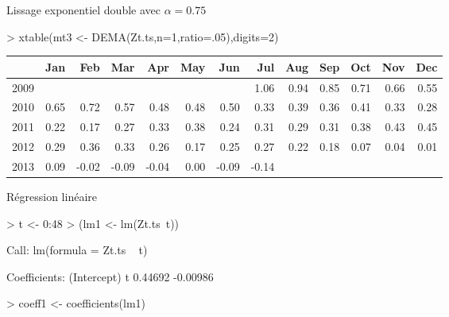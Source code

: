 \documentclass{article}
\begin{document}
\clearpage 
Lissage exponentiel double avec $\alpha=0.75$
\begin{Schunk}
\begin{Sinput}
> xtable(mt3 <- DEMA(Zt.ts,n=1,ratio=.05),digits=2)
\end{Sinput}
\begin{table}[ht]
\centering
\begin{tabular}{rrrrrrrrrrrrr}
  \hline
 & Jan & Feb & Mar & Apr & May & Jun & Jul & Aug & Sep & Oct & Nov & Dec \\ 
  \hline
2009 &  &  &  &  &  &  & 1.06 & 0.94 & 0.85 & 0.71 & 0.66 & 0.55 \\ 
  2010 & 0.65 & 0.72 & 0.57 & 0.48 & 0.48 & 0.50 & 0.33 & 0.39 & 0.36 & 0.41 & 0.33 & 0.28 \\ 
  2011 & 0.22 & 0.17 & 0.27 & 0.33 & 0.38 & 0.24 & 0.31 & 0.29 & 0.31 & 0.38 & 0.43 & 0.45 \\ 
  2012 & 0.29 & 0.36 & 0.33 & 0.26 & 0.17 & 0.25 & 0.27 & 0.22 & 0.18 & 0.07 & 0.04 & 0.01 \\ 
  2013 & 0.09 & -0.02 & -0.09 & -0.04 & 0.00 & -0.09 & -0.14 &  &  &  &  &  \\ 
   \hline
\end{tabular}
\end{table}\end{Schunk}
\clearpage 
Régression linéaire
\begin{Schunk}
\begin{Sinput}
> t <- 0:48
> (lm1 <- lm(Zt.ts~t))
\end{Sinput}
\begin{Soutput}
Call:
lm(formula = Zt.ts ~ t)

Coefficients:
(Intercept)            t  
    0.44692     -0.00986  
\end{Soutput}
\begin{Sinput}
> coeff1 <- coefficients(lm1)
\end{Sinput}
\end{Schunk}
\end{document}
